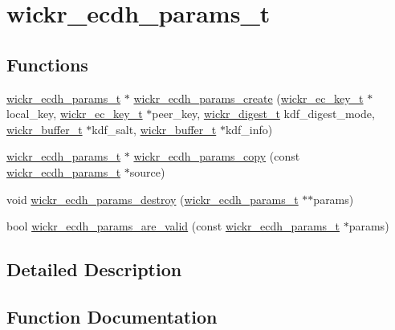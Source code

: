 \hypertarget{group__wickr__ecdh__params}{}\section{wickr\+\_\+ecdh\+\_\+params\+\_\+t}
\label{group__wickr__ecdh__params}
\subsection*{Functions}
\begin{DoxyCompactItemize}
\item 
\hyperlink{structwickr__ecdh__params}{wickr\+\_\+ecdh\+\_\+params\+\_\+t} $\ast$ \hyperlink{group__wickr__ecdh__params_ga57bb855c4155488cf41d6c9e0d1f373d}{wickr\+\_\+ecdh\+\_\+params\+\_\+create} (\hyperlink{structwickr__ec__key}{wickr\+\_\+ec\+\_\+key\+\_\+t} $\ast$local\+\_\+key, \hyperlink{structwickr__ec__key}{wickr\+\_\+ec\+\_\+key\+\_\+t} $\ast$peer\+\_\+key, \hyperlink{structwickr__digest}{wickr\+\_\+digest\+\_\+t} kdf\+\_\+digest\+\_\+mode, \hyperlink{structwickr__buffer}{wickr\+\_\+buffer\+\_\+t} $\ast$kdf\+\_\+salt, \hyperlink{structwickr__buffer}{wickr\+\_\+buffer\+\_\+t} $\ast$kdf\+\_\+info)
\item 
\hyperlink{structwickr__ecdh__params}{wickr\+\_\+ecdh\+\_\+params\+\_\+t} $\ast$ \hyperlink{group__wickr__ecdh__params_ga016f2b643f2636c05ed72bc08a0314f0}{wickr\+\_\+ecdh\+\_\+params\+\_\+copy} (const \hyperlink{structwickr__ecdh__params}{wickr\+\_\+ecdh\+\_\+params\+\_\+t} $\ast$source)
\item 
void \hyperlink{group__wickr__ecdh__params_gaf6efcaf58f603e323443063cde9b5621}{wickr\+\_\+ecdh\+\_\+params\+\_\+destroy} (\hyperlink{structwickr__ecdh__params}{wickr\+\_\+ecdh\+\_\+params\+\_\+t} $\ast$$\ast$params)
\item 
bool \hyperlink{group__wickr__ecdh__params_ga801f1bfae11ac0c94d59bf9dd58f78aa}{wickr\+\_\+ecdh\+\_\+params\+\_\+are\+\_\+valid} (const \hyperlink{structwickr__ecdh__params}{wickr\+\_\+ecdh\+\_\+params\+\_\+t} $\ast$params)
\end{DoxyCompactItemize}


\subsection{Detailed Description}


\subsection{Function Documentation}
\mbox{\label{group__wickr__ecdh__params_ga801f1bfae11ac0c94d59bf9dd58f78aa}} 
